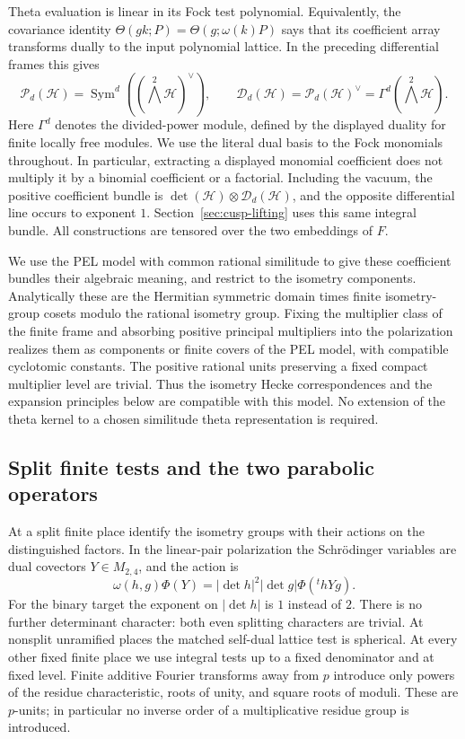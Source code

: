 Theta evaluation is linear in its Fock test polynomial.  Equivalently,
the covariance identity
$\Theta(gk;P)=\Theta(g;\omega(k)P)$ says that its coefficient array
transforms dually to the input polynomial lattice.  In the preceding
differential frames this gives
\begin{equation}\label{eq:dual-fock-lattice}
 \mathcal P_d(\mathcal H)
   =\operatorname{Sym}^d((\textstyle\bigwedge^2\mathcal H)^\vee),
 \qquad
 \mathcal D_d(\mathcal H)
   =\mathcal P_d(\mathcal H)^\vee
   =\Gamma^d(\textstyle\bigwedge^2\mathcal H).
\end{equation}
Here $\Gamma^d$ denotes the divided-power module, defined by the
displayed duality for finite locally free modules.  We use the literal
dual basis to the Fock monomials throughout.  In particular, extracting
a displayed monomial coefficient does not multiply it by a binomial
coefficient or a factorial.  Including the vacuum, the positive
coefficient bundle is
$\det(\mathcal H)\otimes\mathcal D_d(\mathcal H)$, and the
opposite differential line occurs to exponent $1$.
Section~\ref{sec:cusp-lifting} uses this same integral bundle.
All constructions are tensored over the two embeddings of $F$.

We use the PEL model with common rational similitude to give these
coefficient bundles their algebraic meaning, and restrict to the
isometry components.  Analytically these are the Hermitian symmetric
domain times finite isometry-group cosets modulo the rational isometry
group.  Fixing the multiplier class of the finite frame and absorbing
positive principal multipliers into the polarization realizes them as
components or finite covers of the PEL model, with compatible cyclotomic
constants.  The positive rational units preserving a fixed compact
multiplier level are trivial.  Thus the isometry Hecke correspondences
and the expansion principles below are compatible with this model.
No extension of the theta kernel to a chosen similitude theta
representation is required.

\subsection{Split finite tests and the two parabolic operators}

At a split finite place identify the isometry groups with their actions
on the distinguished factors.  In the linear-pair polarization the
Schr\"odinger variables are dual covectors $Y\in M_{2,4}$, and the action
is
\begin{equation}\label{eq:split-weil-action}
 \omega(h,g)\Phi(Y)
  =|\det h|^2|\det g|\Phi({}^thYg).
\end{equation}
For the binary target the exponent on $|\det h|$ is $1$ instead of $2$.
There is no further determinant character: both even splitting
characters are trivial.  At nonsplit unramified places the matched
self-dual lattice test is spherical.  At every other fixed finite place
we use integral tests up to a fixed denominator and at fixed level.
Finite additive Fourier transforms away from $p$ introduce only powers
of the residue characteristic, roots of unity, and square roots of
moduli.  These are $p$-units; in particular no inverse order of a
multiplicative residue group is introduced.

